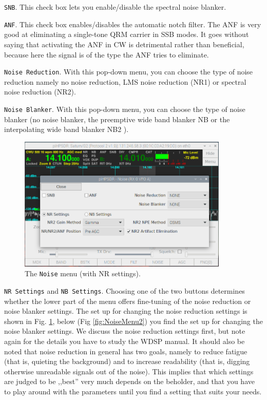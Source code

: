 \documentclass[12pt]{book}
\def\rett#1{\texttt{\color{red}#1}}
\def\bltt#1{\texttt{\color{blue}#1}}
\begin{document}
\rett{SNB}. This check box lets you enable/disable the spectral noise blanker.

\rett{ANF}. This check box enables/disables the automatic notch filter. The ANF is
very good at eliminating a single-tone QRM carrier in SSB modes. It goes without
saying that activating the ANF in CW is detrimental rather than beneficial, because
here the signal is of the type the ANF tries to eliminate.

\rett{Noise Reduction}. With this pop-down menu, you can choose the type of noise reduction
namely no noise reduction, LMS noise reduction (NR1) or spectral noise reduction (NR2).

\rett{Noise Blanker}. With this pop-down menu, you can choose the type of noise blanker
(no noise blanker, the preemptive wide band blanker NB or the interpolating wide band
blanker NB2 ).

\begin{figure}[ht]
\center
\includegraphics[width=10cm]{NoiseMenu1.png}
\caption{The \bltt{Noise} menu (with NR settings).}
\label{fig:NoiseMenu1}
\end{figure}

\rett{NR Settings} and \rett{NB Settings}. Choosing one of the two buttons determines whether the
lower part of the menu offers fine-tuning of the noise reduction or noise blanker settings.
The set up for changing the noise reduction settings is shown in Fig. \ref{fig:NoiseMenu1},
below (Fig \ref{fig:NoiseMenu2}) you find the set up for changing the noise blanker settings.
We discuss the noise reduction settings first, but note again for the details you have
to study the WDSP manual. It should also be noted that noise reduction in general has two
goals, namely to reduce fatigue (that is, quieting the background)
and to increase readability (that is, digging otherwise unreadable signals out of the noise).
 This implies that which settings
are judged to be ,,best'' very much depends on the beholder,
and that you have to play around with the parameters until you find a setting that
suits your needs.
\end{document}

